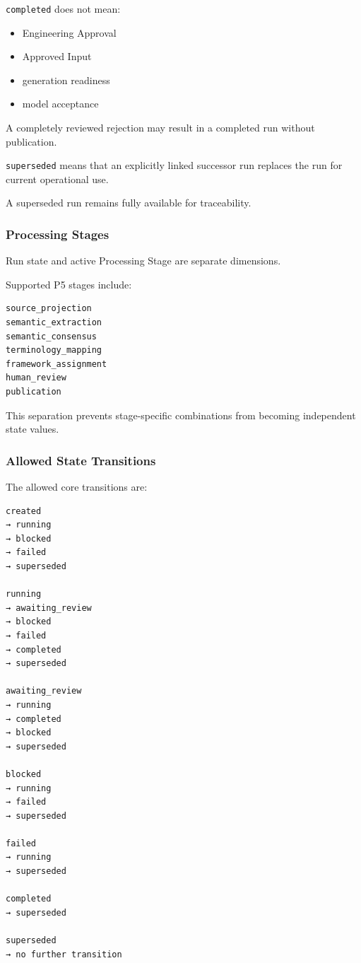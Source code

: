 \texttt{completed} does not mean:

\begin{itemize}
\tightlist
\item
  Engineering Approval
\item
  Approved Input
\item
  generation readiness
\item
  model acceptance
\end{itemize}

A completely reviewed rejection may result in a completed run without publication.

\texttt{superseded} means that an explicitly linked successor run replaces the run for current operational use.

A superseded run remains fully available for traceability.

\hypertarget{processing-stages}{%
\subsubsection{Processing Stages}\label{processing-stages}}

Run state and active Processing Stage are separate dimensions.

Supported P5 stages include:

\begin{verbatim}
source_projection
semantic_extraction
semantic_consensus
terminology_mapping
framework_assignment
human_review
publication
\end{verbatim}

This separation prevents stage-specific combinations from becoming independent state values.

\hypertarget{allowed-state-transitions}{%
\subsubsection{Allowed State Transitions}\label{allowed-state-transitions}}

The allowed core transitions are:

\begin{verbatim}
created
→ running
→ blocked
→ failed
→ superseded

running
→ awaiting_review
→ blocked
→ failed
→ completed
→ superseded

awaiting_review
→ running
→ completed
→ blocked
→ superseded

blocked
→ running
→ failed
→ superseded

failed
→ running
→ superseded

completed
→ superseded

superseded
→ no further transition
\end{verbatim}

